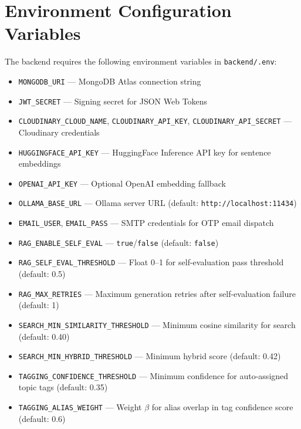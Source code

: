 \documentclass[12pt,a4paper]{report}
\begin{document}
\chapter{Environment Configuration Variables}

The backend requires the following environment variables in \texttt{backend/.env}:

\begin{itemize}[leftmargin=0.5in]
  \item \texttt{MONGODB\_URI} --- MongoDB Atlas connection string
  \item \texttt{JWT\_SECRET} --- Signing secret for JSON Web Tokens
  \item \texttt{CLOUDINARY\_CLOUD\_NAME}, \texttt{CLOUDINARY\_API\_KEY}, \texttt{CLOUDINARY\_API\_SECRET} --- Cloudinary credentials
  \item \texttt{HUGGINGFACE\_API\_KEY} --- HuggingFace Inference API key for sentence embeddings
  \item \texttt{OPENAI\_API\_KEY} --- Optional OpenAI embedding fallback
  \item \texttt{OLLAMA\_BASE\_URL} --- Ollama server URL (default: \texttt{http://localhost:11434})
  \item \texttt{EMAIL\_USER}, \texttt{EMAIL\_PASS} --- SMTP credentials for OTP email dispatch
  \item \texttt{RAG\_ENABLE\_SELF\_EVAL} --- \texttt{true}/\texttt{false} (default: \texttt{false})
  \item \texttt{RAG\_SELF\_EVAL\_THRESHOLD} --- Float 0--1 for self-evaluation pass threshold (default: 0.5)
  \item \texttt{RAG\_MAX\_RETRIES} --- Maximum generation retries after self-evaluation failure (default: 1)
  \item \texttt{SEARCH\_MIN\_SIMILARITY\_THRESHOLD} --- Minimum cosine similarity for search (default: 0.40)
  \item \texttt{SEARCH\_MIN\_HYBRID\_THRESHOLD} --- Minimum hybrid score (default: 0.42)
  \item \texttt{TAGGING\_CONFIDENCE\_THRESHOLD} --- Minimum confidence for auto-assigned topic tags (default: 0.35)
  \item \texttt{TAGGING\_ALIAS\_WEIGHT} --- Weight $\beta$ for alias overlap in tag confidence score (default: 0.6)
\end{itemize}

\newpage
\end{document}
